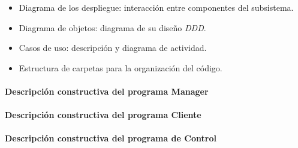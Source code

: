 \begin{itemize}
    \item Diagrama de los despliegue: interacción entre componentes del subsistema.
    \item Diagrama de objetos: diagrama de su diseño \textit{DDD}.
    \item Casos de uso: descripción y diagrama de actividad.
    \item Estructura de carpetas para la organización del código.
\end{itemize}

\paragraph{Descripción constructiva del programa Manager}


\paragraph{Descripción constructiva del programa Cliente}


\paragraph{Descripción constructiva del programa de Control}

